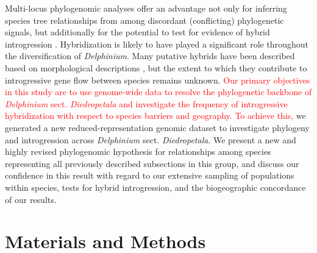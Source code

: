 \documentclass[11pt]{article}
\begin{document}
Multi-locus phylogenomic analyses offer an advantage not only for inferring
species tree relationships from among discordant (conflicting) phylogenetic signals, 
but additionally for the potential to test for evidence of hybrid introgression
\citep{kubatko_species_2023, durand_testing_2011, eaton_historical_2015}.
% 
Hybridization is likely to have played a significant role throughout the 
diversification of \emph{Delphinium}. 
Many putative hybrids have been described based on morphological descriptions 
\citep{ewan_synopsis_1945, warnock_taxonomic_1995, legro_species_1961, koontz_hybrid_2001},
but the extent to which they contribute to introgressive gene 
flow between species remains unknown. \textcolor{red}{Our primary objectives in this 
study are to use genome-wide data to resolve the phylogenetic backbone of 
\emph{Delphinium} sect. \emph{Diedropetala} and investigate the frequency
of introgressive hybridization with respect to species barriers and geography.
To achieve this,} we generated a new reduced-representation genomic dataset to 
investigate phylogeny and introgression across \emph{Delphinium} sect. 
\emph{Diedropetala}.
% 
We present a new and highly revised phylogenomic hypothesis for relationships
among species representing all previously described subsections in this 
group, and discuss our confidence in this result with regard to our 
extensive sampling of populations within species, tests for hybrid 
introgression, and the biogeographic concordance of our results.



\section{Materials and Methods}
\end{document}

